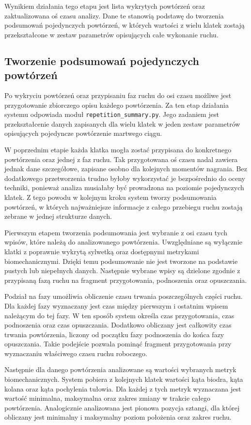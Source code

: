 Wynikiem działania tego etapu jest lista wykrytych powtórzeń oraz zaktualizowana oś czasu analizy. Dane te stanowią podstawę do tworzenia podsumowań pojedynczych powtórzeń, w których wartości z wielu klatek zostają przekształcone w zestaw parametrów opisujących całe wykonanie ruchu.

\subsection{Tworzenie podsumowań pojedynczych powtórzeń}

Po wykryciu powtórzeń oraz przypisaniu faz ruchu do osi czasu możliwe jest przygotowanie zbiorczego opisu każdego powtórzenia. Za ten etap działania systemu odpowiada moduł \texttt{repetition\_summary.py}. Jego zadaniem jest przekształcenie danych zapisanych dla wielu klatek w jeden zestaw parametrów opisujących pojedyncze powtórzenie martwego ciągu.

W poprzednim etapie każda klatka mogła zostać przypisana do konkretnego powtórzenia oraz jednej z faz ruchu. Tak przygotowana oś czasu nadal zawiera jednak dane szczegółowe, zapisane osobno dla kolejnych momentów nagrania. Bez dodatkowego przetworzenia trudno byłoby wykorzystać je bezpośrednio do oceny techniki, ponieważ analiza musiałaby być prowadzona na poziomie pojedynczych klatek. Z tego powodu w kolejnym kroku system tworzy podsumowania powtórzeń, w których najważniejsze informacje z całego przebiegu ruchu zostają zebrane w jednej strukturze danych.

Pierwszym etapem tworzenia podsumowania jest wybranie z osi czasu tych wpisów, które należą do analizowanego powtórzenia. Uwzględniane są wyłącznie klatki z poprawnie wykrytą sylwetką oraz dostępnymi metrykami biomechanicznymi. Dzięki temu podsumowanie nie jest tworzone na podstawie pustych lub niepełnych danych. Następnie wybrane wpisy są dzielone zgodnie z przypisaną fazą ruchu na fragment przygotowania, podnoszenia oraz opuszczania.

Podział na fazy umożliwia obliczenie czasu trwania poszczególnych części ruchu. Dla każdej fazy wyznaczany jest czas między pierwszym i ostatnim wpisem należącym do tej fazy. W ten sposób system określa czas przygotowania, czas podnoszenia oraz czas opuszczania. Dodatkowo obliczany jest całkowity czas trwania powtórzenia, liczony od początku fazy podnoszenia do końca fazy opuszczania. Takie podejście pozwala pominąć fragment przygotowania przy wyznaczaniu właściwego czasu ruchu roboczego.

Następnie dla danego powtórzenia analizowane są wartości wybranych metryk biomechanicznych. System pobiera z kolejnych klatek wartości kąta biodra, kąta kolana oraz kąta pochylenia tułowia. Dla każdej z tych metryk wyznaczana jest wartość minimalna, maksymalna oraz zakres zmiany w trakcie całego powtórzenia. Analogicznie analizowana jest pionowa pozycja sztangi, dla której obliczany jest minimalny i maksymalny poziom położenia oraz zakres ruchu.

